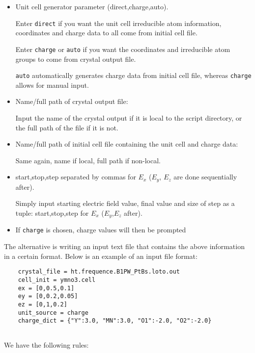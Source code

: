 \begin{itemize}
	\item Unit cell generator parameter (direct,charge,auto).
	
	Enter \texttt{direct} if you want the unit cell irreducible atom information, coordinates and charge data to all come from initial cell file.
	
	Enter \texttt{charge} or \texttt{auto} if you want the coordinates and irreducible atom groups to come from crystal output file.
	
	\texttt{auto} automatically generates charge data from initial cell file, whereas \texttt{charge} allows for manual input.
	
	\item Name/full path of crystal output file:
	
	Input the name of the crystal output if it is local to the script directory, or the full path of the file if it is not.
	
	\item Name/full path of initial cell file containing the unit cell and charge data:
	
	Same again, name if local, full path if non-local.
	
	\item start,stop,step separated by commas for $E_x$ ($E_y$, $E_z$ are done sequentially after).
	
	Simply input starting electric field value, final value and size of step as a tuple: start,stop,step for $E_x$ ($E_y$,$E_z$ after).
	
	\item If \texttt{charge} is chosen, charge values will then be prompted
\end{itemize}

The alternative is writing an input text file that contains the above information in a certain format. Below is an example of an input file format:

\begin{lstlisting}
	crystal_file = ht.frequence.B1PW_PtBs.loto.out
	cell_init = ymno3.cell
	ex = [0,0.5,0.1]
	ey = [0,0.2,0.05]
	ez = [0,1,0.2]
	unit_source = charge
	charge_dict = {"Y":3.0, "MN":3.0, "O1":-2.0, "O2":-2.0}
	
\end{lstlisting}

We have the following rules:

